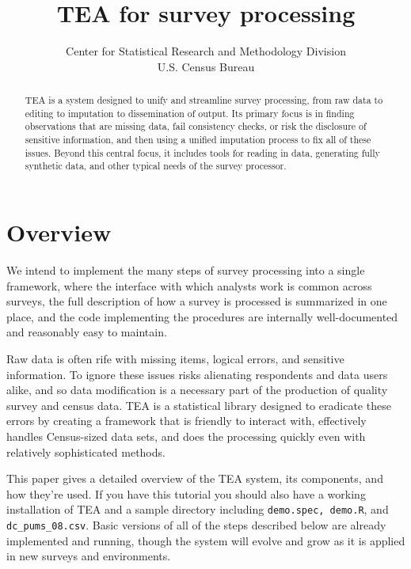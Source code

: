 \documentclass{article}
\begin{document}
\author{Center for Statistical Research and Methodology Division\\U.S. Census Bureau}
\title{TEA for survey processing}
\maketitle

\begin{abstract}
TEA is a system designed to unify and streamline survey processing, from raw data to
editing to imputation to dissemination of output. Its primary focus is in finding 
observations that are missing data, fail consistency checks, or risk the disclosure of
sensitive information, and then using a unified imputation process to fix all of these
issues. Beyond this central focus, it includes tools for reading in data, generating
fully synthetic data, and other typical needs of the survey processor.
\end{abstract}


\section{Overview}
{\sc We intend} to implement the many steps of survey processing into a single
framework, where the interface with which analysts work is common across surveys,
the full description of how a survey is processed is summarized in one place, and the
code implementing the procedures are internally well-documented and reasonably easy
to maintain.

Raw data is often rife with missing items, logical errors, and sensitive information. 
To ignore these issues risks alienating respondents and data users alike, and so data 
modification is a necessary part of the production of quality survey and census data. 
TEA is a statistical library designed to eradicate these errors by creating a framework 
that is friendly to interact with, effectively handles Census-sized data sets, and does 
the processing quickly even with relatively sophisticated methods.

This paper gives a detailed overview of the TEA system, its components, and how they're 
used. If you have this tutorial you should also have a working installation of TEA and 
a sample directory including {\tt demo.spec, demo.R}, and {\tt dc\_pums\_08.csv}. 
Basic versions of all of the steps described below are already implemented and running,
though the system will evolve and grow as it is applied in new surveys and environments.
\end{document}
